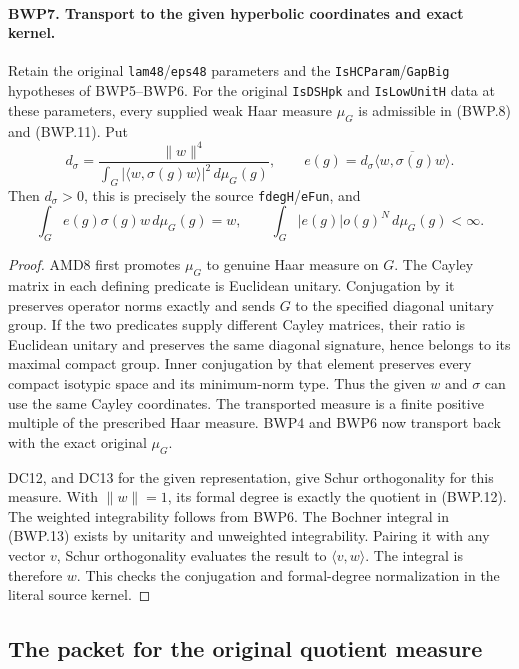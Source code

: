\paragraph{BWP7. Transport to the given hyperbolic coordinates and exact kernel.}
\label{claim:BWP7}
Retain the original \texttt{lam48}/\texttt{eps48} parameters and
the \texttt{IsHCParam}/\texttt{GapBig} hypotheses of BWP5--BWP6.
For the original \texttt{IsDSHpk} and \texttt{IsLowUnitH} data
at these parameters,
every supplied weak Haar measure \(\mu_G\) is admissible in
(BWP.8) and (BWP.11).  Put
\[
 d_\sigma=\frac{\|w\|^4}
 {\int_G|\langle w,\sigma(g)w\rangle|^2\,d\mu_G(g)},
 \qquad e(g)=d_\sigma\overline{\langle w,\sigma(g)w\rangle}.
 \tag{BWP.12}
\]
Then \(d_\sigma>0\), this is precisely the source
\texttt{fdegH}/\texttt{eFun}, and
\[
 \int_G e(g)\sigma(g)w\,d\mu_G(g)=w,
 \qquad \int_G|e(g)|o(g)^N\,d\mu_G(g)<\infty.
 \tag{BWP.13}
\]

\begin{proof}
AMD8 first promotes \(\mu_G\) to genuine Haar measure on \(G\).
The Cayley matrix in each defining predicate is Euclidean unitary.
Conjugation by it preserves operator norms exactly and sends \(G\)
to the specified diagonal unitary group.  If the two predicates supply
different Cayley matrices, their ratio is Euclidean unitary and
preserves the same diagonal signature, hence belongs to its maximal
compact group.  Inner conjugation by that element preserves every
compact isotypic space and its minimum-norm type.  Thus the given
\(w\) and \(\sigma\) can use the same Cayley coordinates.
The transported measure is a finite positive multiple of the prescribed
Haar measure.  BWP4 and BWP6 now transport back with the exact original
\(\mu_G\).

DC12, and DC13 for the given representation, give Schur orthogonality
for this measure.  With \(\|w\|=1\), its formal degree is exactly
the quotient in (BWP.12).  The weighted integrability follows from
BWP6.  The Bochner integral in (BWP.13) exists by unitarity and
unweighted integrability.  Pairing it with any vector \(v\), Schur
orthogonality evaluates the result to \(\langle v,w\rangle\).
The integral is therefore \(w\).  This checks the conjugation and
formal-degree normalization in the literal source kernel.
\end{proof}

\subsection{The packet for the original quotient measure}

